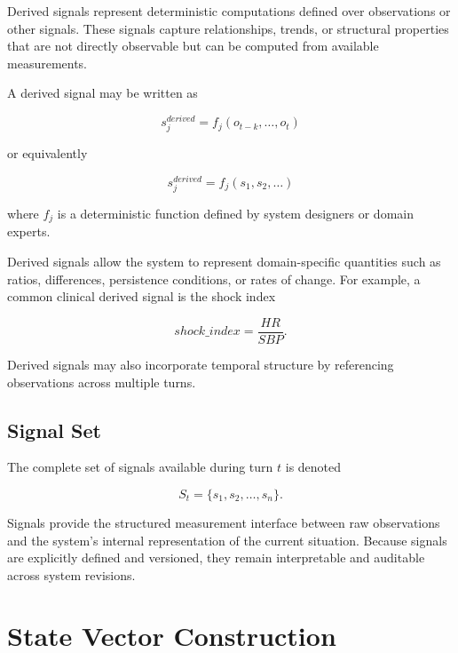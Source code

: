 \documentclass[11pt]{article}
\begin{document}
Derived signals represent deterministic computations defined over observations or other signals. These signals capture relationships, trends, or structural properties that are not directly observable but can be computed from available measurements.

A derived signal may be written as

\begin{equation}
s_j^{derived} = f_j(o_{t-k}, \dots, o_t)
\end{equation}

or equivalently

\begin{equation}
s_j^{derived} = f_j(s_1, s_2, \dots)
\end{equation}

where $f_j$ is a deterministic function defined by system designers or domain experts.

Derived signals allow the system to represent domain-specific quantities such as ratios, differences, persistence conditions, or rates of change. For example, a common clinical derived signal is the shock index

\begin{equation}
shock\_index = \frac{HR}{SBP}.
\end{equation}

Derived signals may also incorporate temporal structure by referencing observations across multiple turns.

\subsection{Signal Set}

The complete set of signals available during turn $t$ is denoted

\begin{equation}
S_t = \{ s_1, s_2, \dots, s_n \}.
\end{equation}

Signals provide the structured measurement interface between raw observations and the system's internal representation of the current situation. Because signals are explicitly defined and versioned, they remain interpretable and auditable across system revisions.





\section{State Vector Construction}
\end{document}
